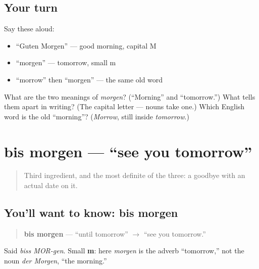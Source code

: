 \subsection*{Your turn}
Say these aloud:

\begin{itemize}
\raggedright
  \item \textquotedblleft{}Guten Morgen\textquotedblright{} — good morning, capital M
  \item \textquotedblleft{}morgen\textquotedblright{} — tomorrow, small m
  \item \textquotedblleft{}morrow\textquotedblright{} then \textquotedblleft{}morgen\textquotedblright{} — the same old word
\end{itemize}

\begin{tcolorbox}[breakable,colback=teal!4,colframe=teal!35!black,title={Before you move on}]
What are the two meanings of \emph{morgen}? (\textquotedblleft{}Morning\textquotedblright{} and \textquotedblleft{}tomorrow.\textquotedblright{}) What tells them apart in writing? (The capital letter — nouns take one.) Which English word is the old \textquotedblleft{}morning\textquotedblright{}? (\emph{Morrow}, still inside \emph{tomorrow}.)
\end{tcolorbox}
\section[bis morgen]{bis morgen — \textquotedblleft{}see you tomorrow\textquotedblright{}}

\label{lesson:GE-C04-bis-morgen}



\begin{quote}
Third ingredient, and the most definite of the three: a goodbye with an actual date on it.
\end{quote}

\subsection*{You'll want to know: bis morgen}
\begin{quote}
\textbf{bis morgen} — \textquotedblleft{}until tomorrow\textquotedblright{} $\to$ \textquotedblleft{}see you tomorrow.\textquotedblright{}
\end{quote}

Said \emph{biss MOR-gen}. Small \textbf{m}: here \emph{morgen} is the adverb \textquotedblleft{}tomorrow,\textquotedblright{} not the noun \emph{der Morgen}, \textquotedblleft{}the morning.\textquotedblright{}

